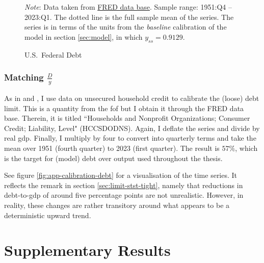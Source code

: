 \documentclass[a4paper,12pt]{article} %
\numberwithin{equation}{section} %
\numberwithin{figure}{section}
\numberwithin{table}{section}
\begin{document}
\begin{refsection}
\begin{appendices}
\begin{figure}[H]
    \centering
    \caption{U.S.~Federal Debt}
    \label{fig:app-calibration-bonds}
    

    \vspace{10pt}
    
    \begin{minipage}{0.75\textwidth} 
    \footnotesize
    \textit{Note}: Data taken from \href{https://fred.stlouisfed.org}{FRED data base}. Sample range: 1951:Q4 -- 2023:Q1. The dotted line is the full sample mean of the series. The series is in terms of the units from the \textit{baseline} calibration of the model in section \ref{sec:model}, in which $y_{ss} = 0.9129$.
    \end{minipage}
\end{figure}

\subsubsection*{Matching $\frac{D}{y}$}

As in \textcite{gl2017} and \textcite{bayer2023}, I use data on unsecured household credit to calibrate the (loose) debt limit. This is a quantity from the \Gls{fof} but I obtain it through the FRED data base. Therein, it is titled ``Households and Nonprofit Organizations; Consumer Credit; Liability, Level" (HCCSDODNS). Again, I deflate the series and divide by real \Gls{gdp}. Finally, I multiply by four to convert into quarterly terms and take the mean over 1951 (fourth quarter) to 2023 (first quarter). The result is $57\%$, which is the target for (model) debt over output used throughout the thesis. 

See figure \ref{fig:app-calibration-debt} for a visualisation of the time series. It reflects the remark in section \ref{sec:limit-stst-tight}, namely that reductions in debt-to-\Gls{gdp} of around five percentage points are not unrealistic. However, in reality, these changes are rather transitory around what appears to be a deterministic upward trend.

\section{Supplementary Results}
\label{sec-app:figures}


\end{appendices}
\end{refsection}
\end{document}
